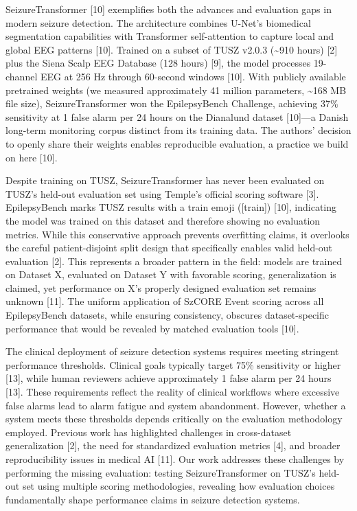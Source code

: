 \documentclass[
]{article}
\begin{document}
SeizureTransformer {[}10{]} exemplifies both the advances and evaluation
gaps in modern seizure detection. The architecture combines U-Net's
biomedical segmentation capabilities with Transformer self-attention to
capture local and global EEG patterns {[}10{]}. Trained on a subset of
TUSZ v2.0.3 (\textasciitilde910 hours) {[}2{]} plus the Siena Scalp EEG
Database (128 hours) {[}9{]}, the model processes 19-channel EEG at 256
Hz through 60-second windows {[}10{]}. With publicly available
pretrained weights (we measured approximately 41 million parameters,
\textasciitilde168 MB file size), SeizureTransformer won the
EpilepsyBench Challenge, achieving 37\% sensitivity at 1 false alarm per
24 hours on the Dianalund dataset {[}10{]}---a Danish long-term
monitoring corpus distinct from its training data. The authors' decision
to openly share their weights enables reproducible evaluation, a
practice we build on here {[}10{]}.

Despite training on TUSZ, SeizureTransformer has never been evaluated on
TUSZ's held-out evaluation set using Temple's official scoring software
{[}3{]}. EpilepsyBench marks TUSZ results with a train emoji
({[}train{]}) {[}10{]}, indicating the model was trained on this dataset
and therefore showing no evaluation metrics. While this conservative
approach prevents overfitting claims, it overlooks the careful
patient-disjoint split design that specifically enables valid held-out
evaluation {[}2{]}. This represents a broader pattern in the field:
models are trained on Dataset X, evaluated on Dataset Y with favorable
scoring, generalization is claimed, yet performance on X's properly
designed evaluation set remains unknown {[}11{]}. The uniform
application of SzCORE Event scoring across all EpilepsyBench datasets,
while ensuring consistency, obscures dataset-specific performance that
would be revealed by matched evaluation tools {[}10{]}.

The clinical deployment of seizure detection systems requires meeting
stringent performance thresholds. Clinical goals typically target 75\%
sensitivity or higher {[}13{]}, while human reviewers achieve
approximately 1 false alarm per 24 hours {[}13{]}. These requirements
reflect the reality of clinical workflows where excessive false alarms
lead to alarm fatigue and system abandonment. However, whether a system
meets these thresholds depends critically on the evaluation methodology
employed. Previous work has highlighted challenges in cross-dataset
generalization {[}2{]}, the need for standardized evaluation metrics
{[}4{]}, and broader reproducibility issues in medical AI {[}11{]}. Our
work addresses these challenges by performing the missing evaluation:
testing SeizureTransformer on TUSZ's held-out set using multiple scoring
methodologies, revealing how evaluation choices fundamentally shape
performance claims in seizure detection systems.
\end{document}
